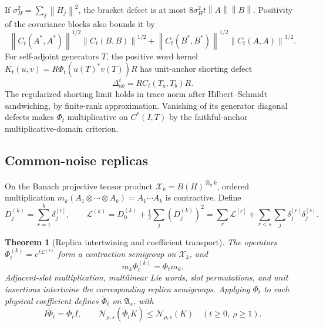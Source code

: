 \documentclass[11pt,a4paper]{amsart}
\numberwithin{equation}{section}
\newtheorem{theorem}{Theorem}[section]
\theoremstyle{definition}
\theoremstyle{remark}
\newcommand{\Alg}{\mathfrak A}
\newcommand{\norm}[1]{\left\lVert#1\right\rVert}
\newcommand{\Nn}[2]{\mathcal N_{#1,s}(#2)}
\begin{document}
If $\sigma_H^2=\sum_j\norm{H_j}^2$, the bracket defect is at most
$8\sigma_H^2t\norm A\norm B$.
Positivity of the covariance blocks also bounds it by
\[
 \norm{C_t(A^*,A^*)}^{1/2}\norm{C_t(B,B)}^{1/2}
 +\norm{C_t(B^*,B^*)}^{1/2}\norm{C_t(A,A)}^{1/2}.
\]
For self-adjoint generators $T$, the positive word kernel
$K_t(u,v)=R\Phi_t(u(T)^*v(T))R$
has unit-anchor shorting defect
\begin{equation}\label{eq:timeflat}
 \Delta_{ab}^t=RC_t(T_a,T_b)R.
\end{equation}
The regularized shorting limit holds in trace norm after Hilbert--Schmidt sandwiching, by finite-rank approximation. Vanishing of its generator diagonal defects makes $\Phi_t$ multiplicative on $C^*(I,T)$ by the faithful-anchor multiplicative-domain criterion.

\subsection{Common-noise replicas}
On the Banach projective tensor product
$\mathcal X_k=B(H)^{\widehat\otimes_\pi k}$,
ordered multiplication $m_k(A_1\otimes\cdots\otimes A_k)=A_1\cdots A_k$ is contractive. Define
\begin{equation}\label{eq:replicagenerator}
 D_j^{(k)}=\sum_{r=1}^k\delta_j^{[r]},\qquad
 \mathcal L^{(k)}=D_0^{(k)}+\tfrac12\sum_j(D_j^{(k)})^2
 =\sum_r\mathcal L^{[r]}+\sum_{r<s}\sum_j\delta_j^{[r]}\delta_j^{[s]}.
\end{equation}
\begin{theorem}[Replica intertwining and coefficient transport]\label{thm:replicas}
The operators $\Phi_t^{(k)}=e^{t\mathcal L^{(k)}}$ form a contraction semigroup on $\mathcal X_k$, and
\begin{equation}\label{eq:replicaintertwine}
 m_k\Phi_t^{(k)}=\Phi_tm_k.
\end{equation}
Adjacent-slot multiplication, multilinear Lie words, slot permutations, and unit insertions intertwine the corresponding replica semigroups. Applying $\Phi_t$ to each physical coefficient defines $\widetilde\Phi_t$ on $\Alg_s$, with
\begin{equation}\label{eq:coeftransport}
 I\widetilde\Phi_t=\Phi_tI,\qquad
 \Nn\rho{\widetilde\Phi_tK}\le\Nn\rho K
 \quad(t\ge0,\ \rho\ge1).
\end{equation}
\end{theorem}
\end{document}
